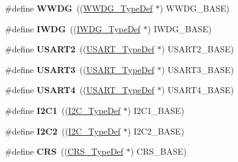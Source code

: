 \begin{DoxyCompactItemize}
\#define {\bfseries W\+W\+DG}~((\hyperlink{struct_w_w_d_g___type_def}{W\+W\+D\+G\+\_\+\+Type\+Def} $\ast$) W\+W\+D\+G\+\_\+\+B\+A\+SE)
\item 
\mbox{\label{group___peripheral__declaration_gad16b79dd94ee85d261d08a8ee94187e7}} 
\#define {\bfseries I\+W\+DG}~((\hyperlink{struct_i_w_d_g___type_def}{I\+W\+D\+G\+\_\+\+Type\+Def} $\ast$) I\+W\+D\+G\+\_\+\+B\+A\+SE)
\item 
\mbox{\label{group___peripheral__declaration_gaf114a9eab03ca08a6fb720e511595930}} 
\#define {\bfseries U\+S\+A\+R\+T2}~((\hyperlink{struct_u_s_a_r_t___type_def}{U\+S\+A\+R\+T\+\_\+\+Type\+Def} $\ast$) U\+S\+A\+R\+T2\+\_\+\+B\+A\+SE)
\item 
\mbox{\label{group___peripheral__declaration_ga2350115553c1fe0a7bc14e6a7ec6a225}} 
\#define {\bfseries U\+S\+A\+R\+T3}~((\hyperlink{struct_u_s_a_r_t___type_def}{U\+S\+A\+R\+T\+\_\+\+Type\+Def} $\ast$) U\+S\+A\+R\+T3\+\_\+\+B\+A\+SE)
\item 
\mbox{\label{group___peripheral__declaration_ga994759b8667e101cc1346d67833d980c}} 
\#define {\bfseries U\+S\+A\+R\+T4}~((\hyperlink{struct_u_s_a_r_t___type_def}{U\+S\+A\+R\+T\+\_\+\+Type\+Def} $\ast$) U\+S\+A\+R\+T4\+\_\+\+B\+A\+SE)
\item 
\mbox{\label{group___peripheral__declaration_gab45d257574da6fe1f091cc45b7eda6cc}} 
\#define {\bfseries I2\+C1}~((\hyperlink{struct_i2_c___type_def}{I2\+C\+\_\+\+Type\+Def} $\ast$) I2\+C1\+\_\+\+B\+A\+SE)
\item 
\mbox{\label{group___peripheral__declaration_gafa60ac20c1921ef1002083bb3e1f5d16}} 
\#define {\bfseries I2\+C2}~((\hyperlink{struct_i2_c___type_def}{I2\+C\+\_\+\+Type\+Def} $\ast$) I2\+C2\+\_\+\+B\+A\+SE)
\item 
\mbox{\label{group___peripheral__declaration_gad151b2f8dbc243ac0ce1fad0c4306328}} 
\#define {\bfseries C\+RS}~((\hyperlink{struct_c_r_s___type_def}{C\+R\+S\+\_\+\+Type\+Def} $\ast$) C\+R\+S\+\_\+\+B\+A\+SE)
\item 

\end{DoxyCompactItemize}
